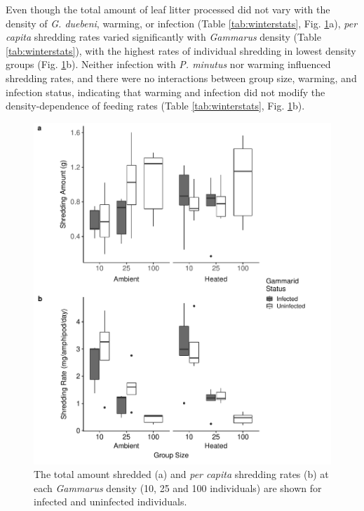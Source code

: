 Even though the total amount of leaf litter processed did not vary with the density of \emph{G. duebeni}, warming, or infection (Table \ref{tab:winterstats}, Fig. \ref{fig:wintershred}a), \emph{per capita} shredding rates varied significantly with \emph{Gammarus} density (Table \ref{tab:winterstats}), with the highest rates of individual shredding in lowest density groups (Fig. \ref{fig:wintershred}b). Neither infection with \emph{P. minutus} nor warming influenced shredding rates, and there were no interactions between group size, warming, and infection status, indicating that warming and infection did not modify the density-dependence of feeding rates (Table \ref{tab:winterstats}, Fig. \ref{fig:wintershred}b).  

\begin{figure}[H]
    \centering
    \includegraphics[keepaspectratio,scale=0.9]{figures/ch5/winter_shred_1.pdf}
  \caption [Density dependence of shredding rates of \emph{G. duebeni} at ambient and warmed temperatures in the field.]{The total amount shredded (a) and \emph{per capita} shredding rates (b) at each \emph{Gammarus} density (10, 25 and 100 individuals) are shown for infected and uninfected individuals.} 
    \label{fig:wintershred}
\end{figure}

